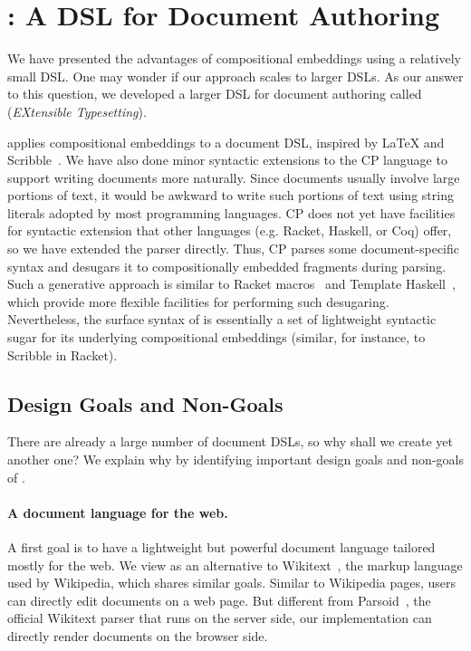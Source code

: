 \section{\ExT: A DSL for Document Authoring} \label{sec:dsl}

We have presented the advantages of compositional embeddings using a relatively
small DSL. One may wonder if our approach scales to larger DSLs. As our answer
to this question, we developed a larger DSL for document authoring called \ExT
(\emph{EXtensible Typesetting}).

\ExT applies compositional embeddings to a document DSL, inspired by \LaTeX{}
and Scribble~\citep{flatt2009scribble}. We have also done minor syntactic
extensions to the CP language to support writing documents more naturally. Since
documents usually involve large portions of text, it would be awkward to write
such portions of text using string literals adopted by most programming
languages. CP does not yet have facilities for syntactic extension that other
languages (e.g. Racket, Haskell, or Coq) offer, so we have extended the parser
directly. Thus, CP parses some document-specific syntax and desugars it to
compositionally embedded fragments during parsing. Such a generative approach is
similar to Racket macros~\citep{ballantyne2020macros} and Template
Haskell~\citep{sheard2002template}, which provide more flexible facilities for
performing such desugaring. Nevertheless, the surface syntax of \ExT is
essentially a set of lightweight syntactic sugar for its underlying
compositional embeddings (similar, for instance, to Scribble in Racket).

\subsection{Design Goals and Non-Goals} \label{sec:goals}

There are already a large number of document DSLs, so why shall we create yet
another one? We explain why by identifying important design goals and non-goals
of \ExT.

\paragraph{A document language for the web.}
A first goal is to have a lightweight but powerful document language tailored
mostly for the web. We view \ExT as an alternative to Wikitext~\citep{wikitext},
the markup language used by Wikipedia, which shares similar goals. Similar to
Wikipedia pages, users can directly edit \ExT documents on a web page. But
different from Parsoid~\citep{parsoid}, the official Wikitext parser that runs
on the server side, our implementation can directly render documents on the
browser side.

